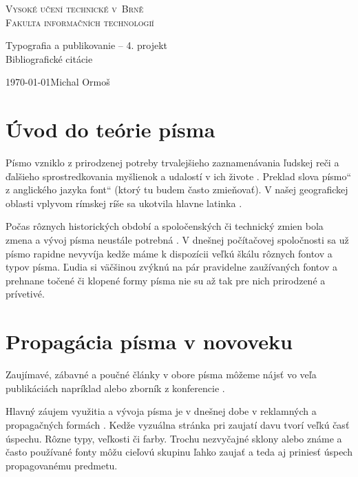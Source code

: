 \documentclass[a4paper, 11pt]{article}
\providecommand{\uv}[1]{\quotedblbase #1\textquotedblleft}
\begin{document}
\begin{titlepage}
\begin{center}
\huge
\textsc{\Huge Vysoké učení technické v~Brně
\\\huge Fakulta informačních technologií}

\Large{Typografia a publikovanie -- 4. projekt}\\
\Huge{Bibliografické citácie}
\end{center}

{\Large \today \hfill Michal Ormoš}
\end{titlepage}

\newpage

\section{Úvod do teórie písma}
Písmo vzniklo z prirodzenej potreby trvalejšieho zaznamenávania ľudskej reči a ďalšieho sprostredkovania myšlienok a udalostí v ich živote \cite{Wiki:pismo}. Preklad slova \uv{písmo} z anglického jazyka \uv{font} (ktorý tu budem často zmieňovať). V našej geografickej oblasti vplyvom rímskej ríše sa ukotvila hlavne latinka \cite{primo:Muzika}.

Počas rôznych historických období a spoločenských či technický zmien bola zmena a vývoj písma neustále potrebná \cite{primo:Jean}. V dnešnej počítačovej spoločnosti sa už písmo rapidne nevyvíja kedže máme k dispozícii veľkú škálu rôznych fontov a typov písma. Ľudia si väčšinou zvýknú na pár pravidelne zaužívaných fontov a prehnane točené či klopené formy písma nie su až tak pre nich prirodzené a prívetivé.

\section{Propagácia písma v novoveku}
Zaujímavé, zábavné a poučné články v obore písma môžeme nájsť vo veľa publikáciách napríklad \cite{primo:article1} alebo zborník z konferencie \cite{primo:conf}.

Hlavný záujem využitia a vývoja písma je v dnešnej dobe v reklamných a propagačných formách \cite{primo:fonts}. Kedže vyzuálna stránka pri zaujatí davu tvorí veľkú časť úspechu. Rôzne typy, veľkosti či farby. Trochu nezvyčajné sklony alebo známe a často používané fonty môžu cieľovú skupinu ľahko zaujať \cite{Wiki:typeface} a teda aj priniesť úspech propagovanému predmetu. 
\end{document}
